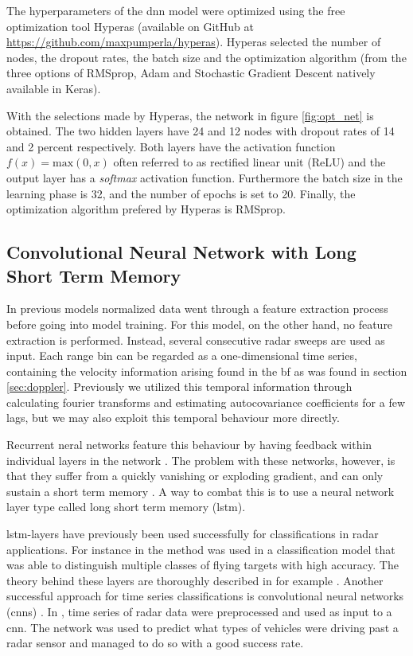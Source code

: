 The hyperparameters of the \gls{dnn} model were optimized using the free optimization tool Hyperas (available on GitHub at \url{https://github.com/maxpumperla/hyperas}). Hyperas selected the number of nodes, the dropout rates, the batch size and the optimization algorithm (from the three options of RMSprop, Adam and Stochastic Gradient Descent natively available in Keras). 

With the selections made by Hyperas, the network in figure \ref{fig:opt_net} is obtained. The two hidden layers have 24 and 12 nodes with dropout rates of 14 and 2 percent respectively. Both layers have the activation function $f(x)=\textrm{max}(0,x)$ often referred to as rectified linear unit (ReLU) and the output layer has a \textit{softmax} activation function. Furthermore the batch size in the learning phase is 32, and the number of epochs is set to 20. Finally, the optimization algorithm prefered by Hyperas is RMSprop.

\subsection{Convolutional Neural Network with Long Short Term Memory}
In previous models normalized data went through a feature extraction process before going into model training. For this model, on the other hand, no feature extraction is performed. Instead, several consecutive radar sweeps are used as input. Each range bin can be regarded as a one-dimensional time series, containing the velocity information arising found in the \gls{bf} as was found in section \ref{sec:doppler}. Previously we utilized this temporal information through calculating fourier transforms and estimating autocovariance coefficients for a few lags, but we may also exploit this temporal behaviour more directly.

Recurrent neral networks feature this behaviour by having feedback within individual layers in the network \citep{karim_majumdar_darabi_chen_2018}. The problem with these networks, however, is that they suffer from a quickly vanishing or exploding gradient, and can only sustain a short term memory \citep{pascanu_mikolov_bengio_2013}. A way to combat this is to use a neural network layer type called long short term memory (\gls{lstm}).

\gls{lstm}-layers have previously been used successfully for classifications in radar applications. For instance in \citep{jithesh_sagayaraj_srinivasa_2018} the method was used in a classification model that was able to distinguish multiple classes of flying targets with high accuracy. The theory behind these layers are thoroughly described in for example \citep{hochreiter_schmidhuber_1997}. Another successful approach for time series classifications is convolutional neural networks (\gls{cnn}s) \citep{karim_majumdar_darabi_chen_2018}. In \citep{capobianco_facheris_cuccoli_marinai_2017}, time series of radar data were preprocessed and used as input to a \gls{cnn}. The network was used to predict what types of vehicles were driving past a radar sensor and managed to do so with a good success rate.


